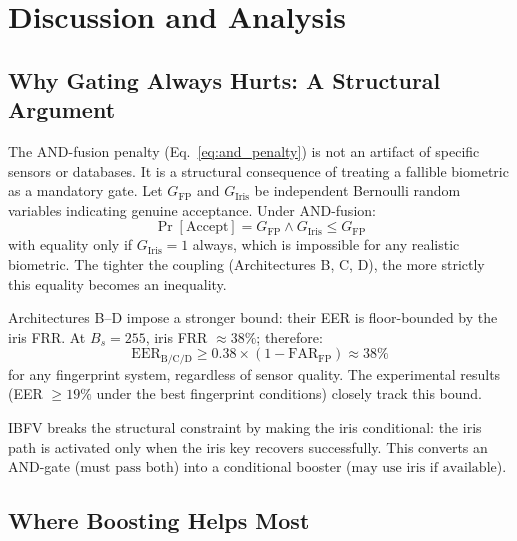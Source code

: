 \chapter{Discussion and Analysis}
\label{ch:discussion}

\section{Why Gating Always Hurts: A Structural Argument}
\label{sec:gating_argument}

The AND-fusion penalty (Eq.~\ref{eq:and_penalty}) is not an artifact of specific
sensors or databases. It is a structural consequence of treating a fallible
biometric as a mandatory gate. Let $G_\mathrm{FP}$ and $G_\mathrm{Iris}$
be independent Bernoulli random variables indicating genuine acceptance. Under
AND-fusion:
\begin{equation}
  \Pr[\mathrm{Accept}] = G_\mathrm{FP} \wedge G_\mathrm{Iris}
  \leq G_\mathrm{FP}
\end{equation}
with equality only if $G_\mathrm{Iris} = 1$ always, which is impossible for
any realistic biometric. The tighter the coupling (Architectures B, C, D), the
more strictly this equality becomes an inequality.

Architectures B--D impose a stronger bound: their EER is floor-bounded by the
iris FRR. At $B_s = 255$, iris FRR $\approx 38\%$; therefore:
\begin{equation}
  \mathrm{EER}_\mathrm{B/C/D} \geq 0.38 \times (1 - \mathrm{FAR}_\mathrm{FP})
  \approx 38\%
\end{equation}
for any fingerprint system, regardless of sensor quality. The experimental results
(EER $\geq 19\%$ under the best fingerprint conditions) closely track this bound.

IBFV breaks the structural constraint by making the iris conditional: the iris
path is activated only when the iris key recovers successfully. This converts an
AND-gate ($\text{must pass both}$) into a conditional booster ($\text{may use
iris if available}$).

\section{Where Boosting Helps Most}
\label{sec:boost_analysis}

